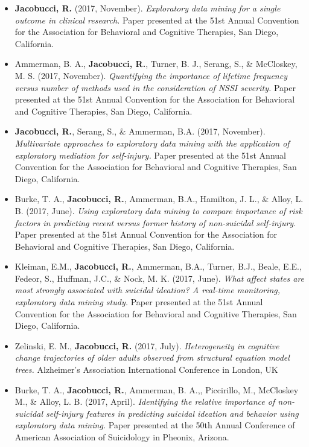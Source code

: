 \documentclass[letterpaper,10pt]{article}
\begin{document}
\begin{itemize}
%
\item[]\textbf{Jacobucci, R.} (2017, November). \emph{Exploratory data mining for a single outcome in clinical research.} Paper presented at the 51st Annual Convention for the Association for Behavioral and Cognitive Therapies, San Diego, California.
%
\item[]Ammerman, B. A., \textbf{Jacobucci, R.}, Turner, B. J., Serang, S., \& McCloskey, M. S. (2017, November). \emph{Quantifying the importance of lifetime frequency versus number of methods used in the consideration of NSSI severity.} Paper presented at the 51st Annual Convention for the Association for Behavioral and Cognitive Therapies, San Diego, California.
%
\item[]\textbf{Jacobucci, R.}, Serang, S., \& Ammerman, B.A. (2017, November). \emph{Multivariate approaches to exploratory data mining with the application of exploratory mediation for self-injury.} Paper presented at the 51st Annual Convention for the Association for Behavioral and Cognitive Therapies, San Diego, California.
%
\item[]Burke, T. A., \textbf{Jacobucci, R.}, Ammerman, B.A., Hamilton, J. L., \& Alloy, L. B. (2017, June). \emph{Using exploratory data mining to compare importance of risk factors in predicting recent versus former history of non-suicidal self-injury.} Paper presented at the 51st Annual Convention for the Association for Behavioral and Cognitive Therapies, San Diego, California.
%
\item[] Kleiman, E.M., \textbf{Jacobucci, R.}, Ammerman, B.A., Turner, B.J., Beale, E.E., Fedeor, S., Huffman, J.C., \& Nock, M. K. (2017, June). \emph{What affect states are most strongly associated with suicidal ideation? A real-time monitoring, exploratory data mining study.} Paper presented at the 51st Annual Convention for the Association for Behavioral and Cognitive Therapies, San Diego, California.
%

%
\item[] Zelinski, E. M., \textbf{Jacobucci, R.} (2017, July). \emph{Heterogeneity in cognitive change trajectories of older adults observed from structural equation model trees.} Alzheimer’s Association International Conference in London, UK
%
\item[]Burke, T. A., \textbf{Jacobucci, R.}, Ammerman, B. A.,, Piccirillo, M., McCloskey M., \& Alloy, L. B. (2017, April). \textit{Identifying the relative importance of non-suicidal self-injury features in predicting suicidal ideation and behavior using exploratory data mining.} Paper presented at the 50th Annual Conference of American Association of Suicidology in Pheonix, Arizona.


\end{itemize}
\end{document}
